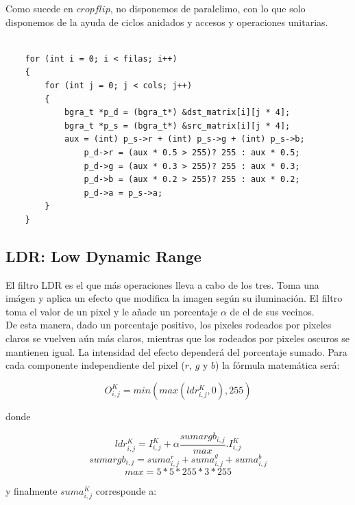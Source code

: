 Como sucede en $cropflip$, no disponemos de paralelimo, con lo que solo disponemos de la ayuda de ciclos anidados y accesos y operaciones unitarias.

\begin{codesnippet}
\begin{verbatim}

    for (int i = 0; i < filas; i++)
    {
        for (int j = 0; j < cols; j++)
        {
            bgra_t *p_d = (bgra_t*) &dst_matrix[i][j * 4];
            bgra_t *p_s = (bgra_t*) &src_matrix[i][j * 4];
            aux = (int) p_s->r + (int) p_s->g + (int) p_s->b;	
				p_d->r = (aux * 0.5 > 255)? 255 : aux * 0.5;
				p_d->g = (aux * 0.3 > 255)? 255 : aux * 0.3;
				p_d->b = (aux * 0.2 > 255)? 255 : aux * 0.2;
				p_d->a = p_s->a;
        }		
    }	

\end{verbatim}
\end{codesnippet}


\subsection{LDR: Low Dynamic Range}

El filtro LDR es el que más operaciones lleva a cabo de los tres.
Toma una imágen y aplica un efecto que modifica la imagen según su iluminación. El filtro toma el valor de un pixel y le añade un porcentaje $\alpha$ de el de sus vecinos.\\

De esta manera, dado un porcentaje positivo, los pixeles rodeados por pixeles claros se vuelven
aún más claros, mientras que los rodeados por pixeles oscuros se mantienen igual. La intensidad
del efecto dependerá del porcentaje sumado.
Para cada componente independiente del pixel ($r$, $g$ y $b$) la fórmula matemática será:

\begin{center}
$$O_{i,j}^{K} = min(max(ldr_{i,j}^{K},0),255)$$
\end{center}

donde

\begin{center}
$$ldr_{i,j}^{K} = I_{i,j}^{K} + \alpha \frac{sumargb_{i,j}}{max} . I_{i,j}^{K}$$
$$sumargb_{i,j} = suma_{i,j}^{r} + suma_{i,j}^{g} + suma_{i,j}^{b}$$
$$max = 5*5*255*3*255$$
\end{center}

y finalmente $suma_{i,j}^{K}$ corresponde a:

